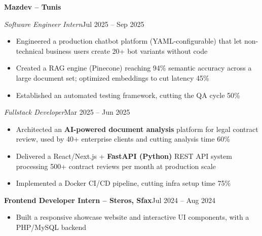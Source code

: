 \documentclass[10pt,a4paper]{article}
\newcommand{\entry}[2]{\vspace{1pt}\noindent\textbf{#1}\hfill{\color{muted}#2}\par}
\newcommand{\subentry}[2]{\noindent\textit{#1}\hfill{\color{muted}#2}\par}
\begin{document}
\entry{Mazdev -- Tunis}{}
\subentry{Software Engineer Intern}{Jul 2025 -- Sep 2025}
\begin{itemize}
  \item Engineered a production chatbot platform (YAML-configurable) that let non-technical business users create 20+ bot variants without code
  \item Created a RAG engine (Pinecone) reaching 94\% semantic accuracy across a large document set; optimized embeddings to cut latency 45\%
  \item Established an automated testing framework, cutting the QA cycle 50\%
\end{itemize}
\subentry{Fullstack Developer}{Mar 2025 -- Jun 2025}
\begin{itemize}
  \item Architected an \textbf{AI-powered document analysis} platform for legal contract review, used by 40+ enterprise clients and cutting analysis time 60\%
  \item Delivered a React/Next.js + \textbf{FastAPI (Python)} REST API system processing 500+ contract reviews per month at production scale
  \item Implemented a Docker CI/CD pipeline, cutting infra setup time 75\%
\end{itemize}

\entry{Frontend Developer Intern -- Steros, Sfax}{Jul 2024 -- Aug 2024}
\begin{itemize}
  \item Built a responsive showcase website and interactive UI components, with a PHP/MySQL backend
\end{itemize}
\end{document}

